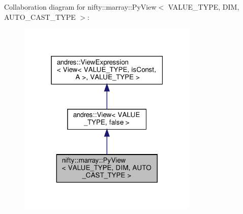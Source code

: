 Collaboration diagram for nifty\+:\+:marray\+:\+:Py\+View$<$ V\+A\+L\+U\+E\+\_\+\+T\+Y\+PE, D\+IM, A\+U\+T\+O\+\_\+\+C\+A\+S\+T\+\_\+\+T\+Y\+PE $>$\+:
\nopagebreak
\begin{figure}[H]
\begin{center}
\leavevmode
\includegraphics[width=244pt]{classnifty_1_1marray_1_1PyView__coll__graph}
\end{center}
\end{figure}
